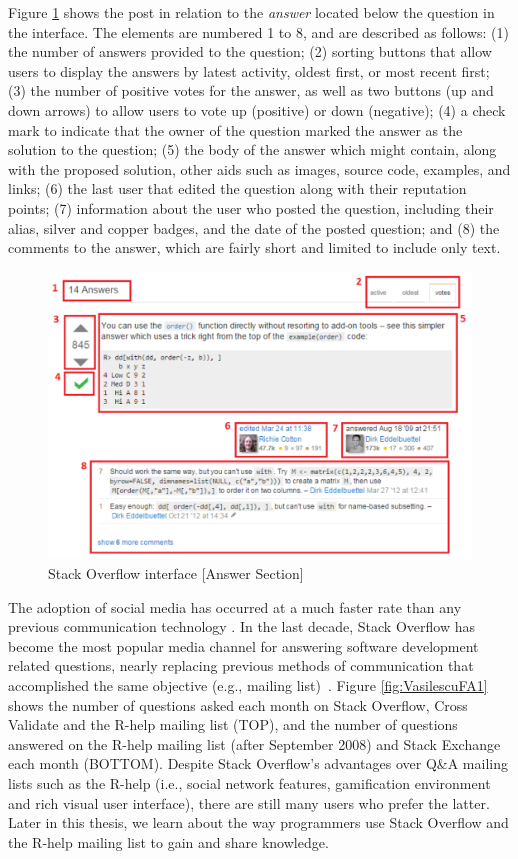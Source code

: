 \documentclass{sig-alternate-05-2015}
\begin{document}
	Figure \ref{fig:SOInterface_B} shows the post in relation to the \textit{answer} located below the question in the interface.
	The elements are numbered 1 to 8, and are described as follows:
	(1) the number of answers provided to the question;
	(2) sorting buttons that allow users to display the answers by latest activity, oldest first, or most recent first;
	(3) the number of positive votes for the answer, as well as two buttons (up and down arrows) to allow users to vote up (positive) or down (negative);
	(4) a check mark to indicate that the owner of the question marked the answer as the solution to the question;
	(5) the body of the answer which might contain, along with the proposed solution, other aids such as images, source code, examples, and links;
	(6)	the last user that edited the question along with their reputation points;
	(7) information about the user who posted the question, including their alias, silver and copper badges, and the date of the posted question;
	and (8) the comments to the answer, which are fairly short and limited to include only text.

	\begin{figure}[!htb]
	\centering
	\includegraphics[width=0.8\columnwidth]{Figures/SOInterface_B}
	\caption{Stack Overflow interface [Answer Section]}
	\label{fig:SOInterface_B}
	\end{figure}

	The adoption of social media has occurred at a much faster rate than any previous communication technology \cite{Chui2012}.
	In the last decade, Stack Overflow has become the most popular media channel for answering software development related questions, nearly replacing previous methods of communication that accomplished the same objective (e.g., mailing list)~\cite{Vasilescu2014c}.
	Figure \ref{fig:VasilescuFA1} shows the number of questions asked each month on Stack Overflow, Cross Validate and the R-help mailing list (TOP), and the number of questions answered on the R-help mailing list (after September 2008) and Stack Exchange each month (BOTTOM).
	Despite Stack Overflow's advantages over Q\&A mailing lists such as the R-help (i.e., social network features, gamification environment and rich visual user interface), there are still many users who prefer the latter.
	Later in this thesis, we learn about the way programmers use Stack Overflow and the R-help mailing list to gain and share knowledge.
\end{document}
